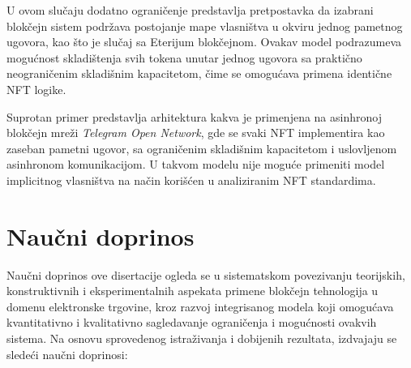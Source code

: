 U ovom slučaju dodatno ograničenje predstavlja pretpostavka da izabrani blokčejn sistem podržava postojanje mape vlasništva u okviru jednog pametnog ugovora, kao što je slučaj sa Eterijum blokčejnom. Ovakav model podrazumeva mogućnost skladištenja svih tokena unutar jednog ugovora sa praktično neograničenim skladišnim kapacitetom, čime se omogućava primena identične NFT logike.

Suprotan primer predstavlja arhitektura kakva je primenjena na asinhronoj blokčejn mreži \textit{Telegram Open Network}, gde se svaki NFT implementira kao zaseban pametni ugovor, sa ograničenim skladišnim kapacitetom i uslovljenom asinhronom komunikacijom. U takvom modelu nije moguće primeniti model implicitnog vlasništva na način korišćen u analiziranim NFT standardima. 

\section{Naučni doprinos}
Naučni doprinos ove disertacije ogleda se u sistematskom povezivanju teorijskih, konstruktivnih i eksperimentalnih aspekata primene blokčejn tehnologija u domenu elektronske trgovine, kroz razvoj integrisanog modela koji omogućava kvantitativno i kvalitativno sagledavanje ograničenja i mogućnosti ovakvih sistema. Na osnovu sprovedenog istraživanja i dobijenih rezultata, izdvajaju se sledeći naučni doprinosi:

